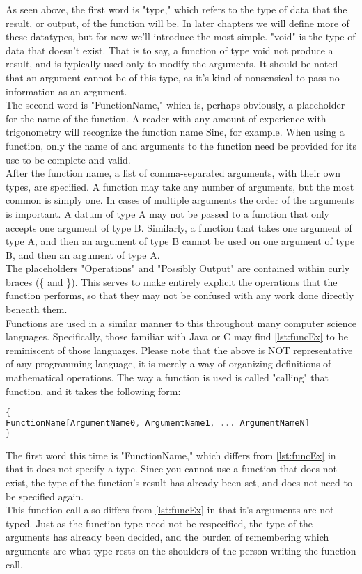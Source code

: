 As seen above, the first word is "type," which refers to the type of data that the result, or output, of the function will be. In later chapters we will define more of these datatypes, but for now we'll introduce the most simple.
"void" is the type of data that doesn't exist. That is to say, a function of type void not produce a result, and is typically used only to modify the arguments.
It should be noted that an argument cannot be of this type, as it's kind of nonsensical to pass no information as an argument. \\
The second word is "FunctionName," which is, perhaps obviously, a placeholder for the name of the function. A reader with any amount of experience with trigonometry will recognize the function name Sine, for example. When using a function, only the name of and arguments to the function need be provided for its use to be complete and valid. \\
After the function name, a list of comma-separated arguments, with their own types, are specified. A function may take any number of arguments, but the most common is simply one. In cases of multiple arguments the order of the arguments is important. A datum of type A may not be passed to a function that only accepts one argument of type B. Similarly, a function that takes one argument of type A, and then an argument of type B cannot be used on one argument of type B, and then an argument of type A. \\
The placeholders "Operations" and "Possibly Output" are contained within curly braces (\{ and \}). This serves to make entirely explicit the operations that the function performs, so that they may not be confused with any work done directly beneath them. \\
Functions are used in a similar manner to this throughout many computer science languages. Specifically, those familiar with Java or C may find 
\ref{lst:funcEx} to be reminiscent of those languages. Please note that the above is NOT representative of any programming language, it is merely a way of organizing definitions of mathematical operations.
The way a function is used is called "calling" that function, and it takes the following form:
\begin{center}
\begin{lstlisting}[language=C, caption=Function Call Example, label=lst:funcCallEx]{
FunctionName[ArgumentName0, ArgumentName1, ... ArgumentNameN]
}
\end{lstlisting}
\end{center}
The first word this time is "FunctionName," which differs from \ref{lst:funcEx} in that it does not specify a type. Since you cannot use a function that does not exist, the type of the function's result has already been set, and does not need to be specified again. \\
This function call also differs from \ref{lst:funcEx} in that it's arguments are not typed. Just as the function type need not be respecified, the type of the arguments has already been decided, and the burden of remembering which arguments are what type rests on the shoulders of the person writing the function call.